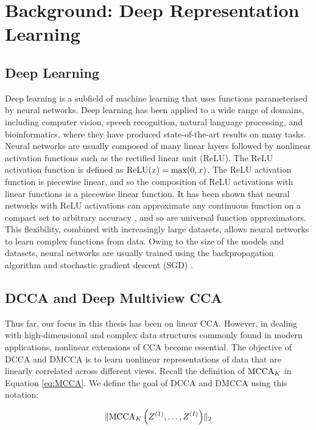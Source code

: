 \section{Background: Deep Representation Learning}

\subsection{Deep Learning}

Deep learning is a subfield of machine learning that uses functions parameterised by neural networks.
Deep learning has been applied to a wide range of domains, including computer vision, speech recognition, natural language processing, and bioinformatics, where they have produced state-of-the-art results on many tasks.
Neural networks are usually composed of many linear layers followed by nonlinear activation functions such as the rectified linear unit (ReLU).
The ReLU activation function is defined as $\operatorname{ReLU}(x) = \max(0, x)$.
The ReLU activation function is piecewise linear, and so the composition of ReLU activations with linear functions is a piecewise linear function.
It has been shown that neural networks with ReLU activations can approximate any continuous function on a compact set to arbitrary accuracy \citep{perekrestenko2018universal}, and so are universal function approximators.
This flexibility, combined with increasingly large datasets, allows neural networks to learn complex functions from data.
Owing to the size of the models and datasets, neural networks are usually trained using the backpropagation algorithm and stochastic gradient descent (SGD) \citep{amari1993backpropagation}.

\subsection{DCCA and Deep Multiview CCA}

Thus far, our focus in this thesis has been on linear CCA. However, in dealing with high-dimensional and complex data structures commonly found in modern applications, nonlinear extensions of CCA become essential.
The objective of DCCA and DMCCA is to learn nonlinear representations of data that are linearly correlated across different views. Recall the definition of $\operatorname{MCCA}_K$ in Equation \eqref{eq:MCCA}. We define the goal of DCCA and DMCCA using this notation:

\begin{align}
\label{eq:DMCCA-def}
\lVert\operatorname{MCCA}_K\left(Z^{(1)}, \ldots, Z^{(I)}\right)\rVert_2
\end{align}

